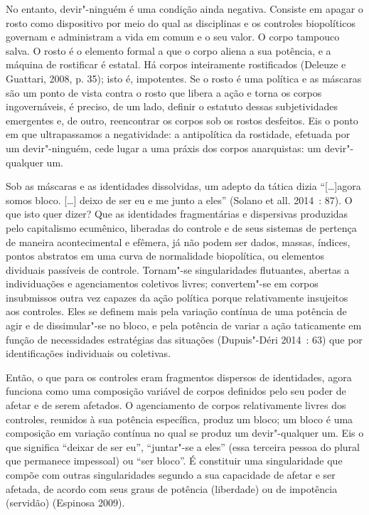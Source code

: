 No entanto, devir"-ninguém é uma condição ainda
negativa. Consiste em apagar o rosto como dispositivo por meio do qual
as disciplinas e os controles biopolíticos governam e administram a vida
em comum e o seu valor. O corpo tampouco salva. O rosto é o elemento
formal a que o corpo aliena a sua potência, e a máquina de rostificar é
estatal. Há corpos inteiramente rostificados (Deleuze e Guattari, 2008,
p. 35); isto é, impotentes. Se o rosto é uma política e as máscaras são
um ponto de vista contra o rosto que libera a ação e torna os corpos
ingovernáveis, é preciso, de um lado, definir o estatuto dessas
subjetividades emergentes e, de outro, reencontrar os corpos sob os
rostos desfeitos. Eis o ponto em que ultrapassamos a negatividade: a
antipolítica da rostidade, efetuada por um devir"-ninguém, cede lugar a
uma práxis dos corpos anarquistas: um devir"-qualquer um.

Sob as máscaras e as identidades dissolvidas, um adepto da tática dizia
``{[}\ldots{}{]}agora somos bloco. {[}\ldots{}{]} deixo de ser eu e me junto
a eles'' (Solano et all. 2014~: 87). O que isto quer dizer? Que as
identidades fragmentárias e dispersivas produzidas pelo capitalismo
ecumênico, liberadas do controle e de seus sistemas de pertença de
maneira acontecimental e efêmera, já não podem ser dados, massas,
índices, pontos abstratos em uma curva de normalidade biopolítica, ou
elementos dividuais passíveis de controle. Tornam"-se singularidades
flutuantes, abertas a individuações e agenciamentos coletivos livres;
convertem"-se em corpos insubmissos outra vez capazes da ação política
porque relativamente insujeitos aos controles. Eles se definem mais pela
variação contínua de uma potência de agir e de dissimular"-se no bloco, e
pela potência de variar a ação taticamente em função de necessidades
estratégias das situações (Dupuis"-Déri 2014~: 63) que por identificações
individuais ou coletivas.

Então, o que para os controles eram fragmentos dispersos de identidades,
agora funciona como uma composição variável de corpos definidos pelo seu
poder de afetar e de serem afetados. O agenciamento de corpos
relativamente livres dos controles, reunidos à sua potência específica,
produz um bloco; um bloco é uma composição em variação contínua no qual
se produz um devir"-qualquer um. Eis o que significa ``deixar de ser
eu'', ``juntar"-se a eles'' (essa terceira pessoa do plural que permanece
impessoal) ou ``ser bloco''. É constituir uma singularidade que compõe
com outras singularidades segundo a sua capacidade de afetar e ser
afetada, de acordo com seus graus de potência (liberdade) ou de
impotência (servidão) (Espinosa 2009).

